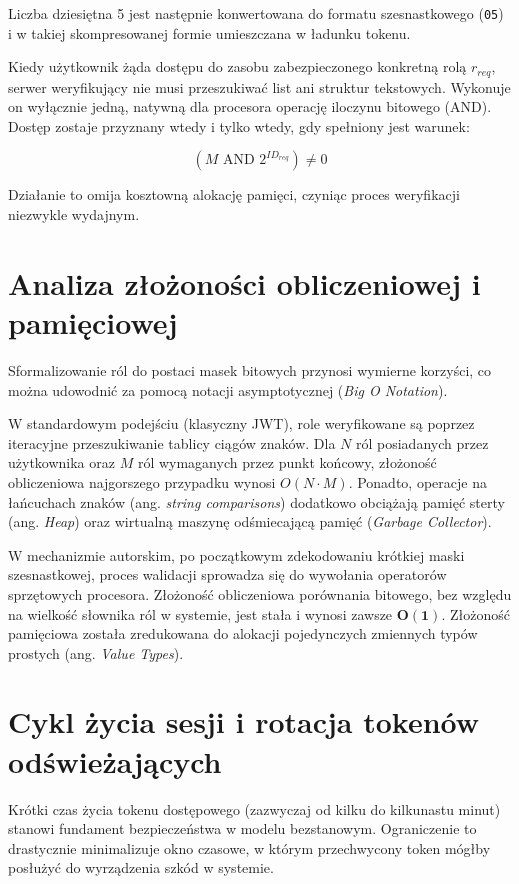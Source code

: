 \documentclass{SGGW-thesis}
\begin{document}
Liczba dziesiętna 5 jest następnie konwertowana do formatu szesnastkowego (\texttt{05}) i w takiej skompresowanej formie umieszczana w ładunku tokenu.

Kiedy użytkownik żąda dostępu do zasobu zabezpieczonego konkretną rolą $r_{req}$, serwer weryfikujący nie musi przeszukiwać list ani struktur tekstowych. Wykonuje on wyłącznie jedną, natywną dla procesora operację iloczynu bitowego (AND). Dostęp zostaje przyznany wtedy i tylko wtedy, gdy spełniony jest warunek:

$$ (M \text{ AND } 2^{ID_{req}}) \neq 0 $$

Działanie to omija kosztowną alokację pamięci, czyniąc proces weryfikacji niezwykle wydajnym.

\section{Analiza złożoności obliczeniowej i pamięciowej}

Sformalizowanie ról do postaci masek bitowych przynosi wymierne korzyści, co można udowodnić za pomocą notacji asymptotycznej (\textit{Big O Notation}). 

W standardowym podejściu (klasyczny JWT), role weryfikowane są poprzez iteracyjne przeszukiwanie tablicy ciągów znaków. Dla $N$ ról posiadanych przez użytkownika oraz $M$ ról wymaganych przez punkt końcowy, złożoność obliczeniowa najgorszego przypadku wynosi $O(N \cdot M)$. Ponadto, operacje na łańcuchach znaków (ang. \textit{string comparisons}) dodatkowo obciążają pamięć sterty (ang. \textit{Heap}) oraz wirtualną maszynę odśmiecającą pamięć (\textit{Garbage Collector}).

W mechanizmie autorskim, po początkowym zdekodowaniu krótkiej maski szesnastkowej, proces walidacji sprowadza się do wywołania operatorów sprzętowych procesora. Złożoność obliczeniowa porównania bitowego, bez względu na wielkość słownika ról w systemie, jest stała i wynosi zawsze $\boldsymbol{O(1)}$. Złożoność pamięciowa została zredukowana do alokacji pojedynczych zmiennych typów prostych (ang. \textit{Value Types}).

\clearpage

\section{Cykl życia sesji i rotacja tokenów odświeżających}

Krótki czas życia tokenu dostępowego (zazwyczaj od kilku do kilkunastu minut) stanowi fundament bezpieczeństwa w modelu bezstanowym. Ograniczenie to drastycznie minimalizuje okno czasowe, w którym przechwycony token mógłby posłużyć do wyrządzenia szkód w systemie.
\end{document}
